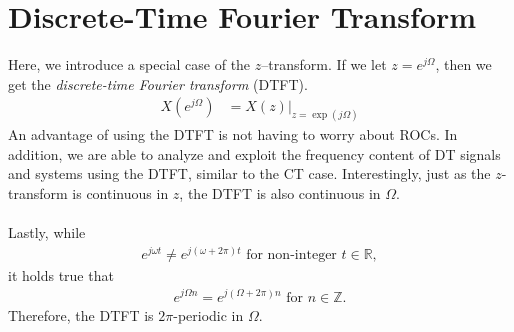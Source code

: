 \documentclass{report}
\begin{document}
\setcounter{chapter}{4}
\setcounter{page}{54}
\chapter{Discrete-Time Fourier Transform}

Here, we introduce a special case of the $z$--transform. If we let $z=e^{j\Omega}$, then we get the \emph{discrete-time Fourier transform} (DTFT).
\begin{align}
    X(e^{j\Omega}) &= X(z)\big|_{z=\exp(j\Omega)}
\end{align}
An advantage of using the DTFT is not having to worry about ROCs. In addition, we are able to analyze and exploit the frequency content of DT signals and systems 
using the DTFT, similar to the CT case. Interestingly, just as the $z$-transform is continuous in $z$, the DTFT is also continuous in $\Omega$.
\\ \\
Lastly, while 
\begin{align}
    e^{j\omega t} \neq e^{j(\omega+2\pi)t} \text{ for non-integer } t\in\mathbb{R},
\end{align}
it holds true that 
\begin{align}
    e^{j\Omega n} = e^{j(\Omega+2\pi)n} \text{ for } n\in\mathbb{Z}.
\end{align}
Therefore, the DTFT is $2\pi$-periodic in $\Omega$.
\end{document}
